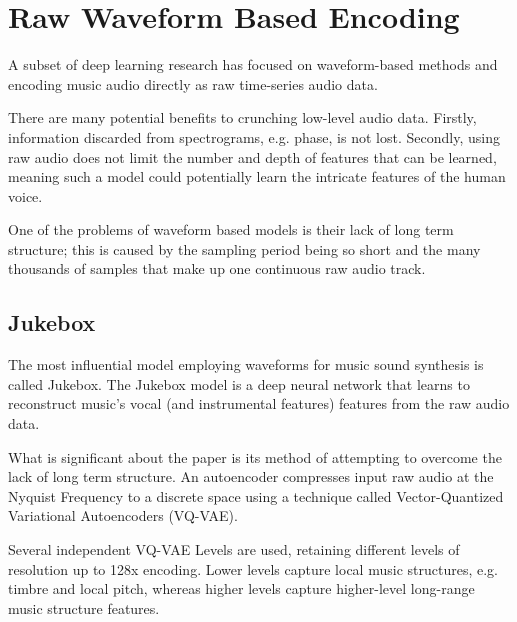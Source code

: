 \section{Raw Waveform Based Encoding}

A subset of deep learning research has focused on waveform-based methods and encoding music audio directly as raw time-series audio data.

There are many potential benefits to crunching low-level audio data. Firstly, information discarded from spectrograms, e.g. phase, is not lost. Secondly, using raw audio does not limit the number and depth of features that can be learned, meaning such a model could potentially learn the intricate features of the human voice.

One of the problems of waveform based models is their lack of long term structure; this is caused by the sampling period being so short and the many thousands of samples that make up one continuous raw audio track\cite{JukeboxWebsite}.

\subsection{Jukebox}
\label{sec:jukebox}

The most influential model employing waveforms for music sound synthesis is called Jukebox\cite{Jukebox}. The Jukebox model is a deep neural network that learns to reconstruct music's vocal (and instrumental features) features from the raw audio data.

What is significant about the paper is its method of attempting to overcome the lack of long term structure. An autoencoder compresses input raw audio at the Nyquist Frequency to a discrete space using a technique called Vector-Quantized Variational Autoencoders (VQ-VAE)\cite{Jukebox}.

\vspace{0.5cm}
\vspace{0.5cm}

Several independent VQ-VAE Levels are used, retaining different levels of resolution up to 128x encoding. Lower levels capture local music structures, e.g. timbre and local pitch, whereas higher levels capture higher-level long-range music structure features.

